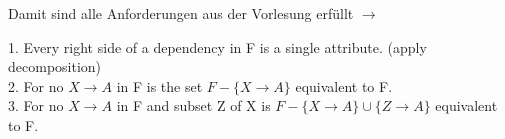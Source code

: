 Damit sind alle Anforderungen aus der Vorlesung erfüllt $\rightarrow$ 

1. Every right side of a dependency in F is a single attribute.
(apply decomposition) \\
2. For no $ X \rightarrow A $ in F is the set $F - \{ X \rightarrow A \}$
equivalent to F. \\
3. For no $ X \rightarrow A $ in F and subset Z of X is
$F - \{ X \rightarrow A \} \cup \{ Z \rightarrow A \}$ equivalent to F.




